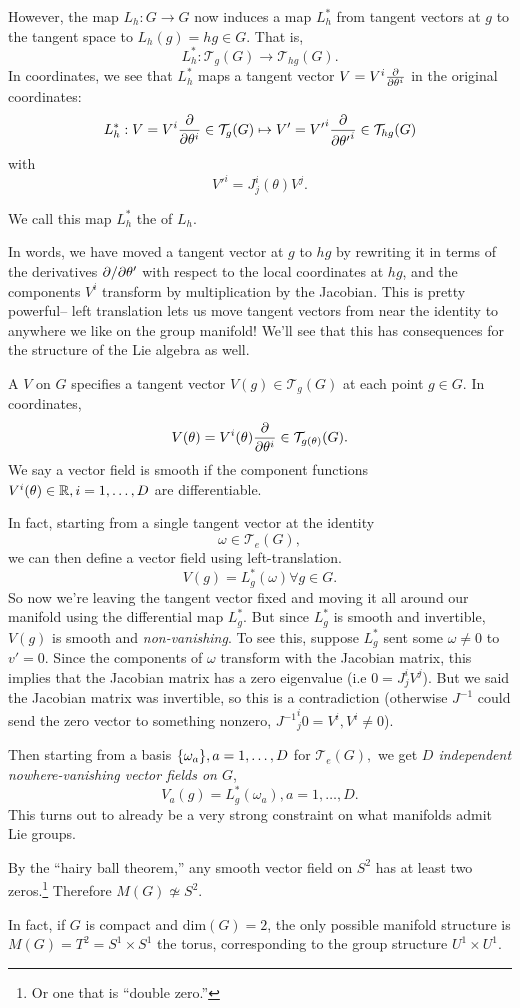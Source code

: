\begin{defn}
However, the map $L_h:G\to G$ now induces a map $L_h^*$ from tangent vectors at $g$ to the tangent space to $L_h(g)=hg\in G$. That is,
$$L_h^*: \mathcal{T}_g(G)\to \mathcal{T}_{hg}(G).$$
In coordinates, we see that $L_h^*$ maps a tangent vector $V=V^i \P{}{\theta^i}$ in the original coordinates:
$$L_h^*: V=V^i \P{}{\theta^i}\in \mathcal{T}_g(G)\mapsto V'={V'}^i \P{}{{\theta'}^i}\in \mathcal{T}_{hg}(G)$$
with $${V'}^i=J^i_j (\theta) V^j.$$

We call this map $L_h^*$ the  of $L_h$.
\end{defn}
In words, we have moved a tangent vector at $g$ to $hg$ by rewriting it in terms of the derivatives $\p/\p\theta'$ with respect to the local coordinates at $hg$, and the components $V^i$ transform by multiplication by the Jacobian. This is pretty powerful-- left translation lets us move tangent vectors from near the identity to anywhere we like on the group manifold! We'll see that this has consequences for the structure of the Lie algebra as well.

\begin{defn}
A  $V$ on $G$ specifies a tangent vector
$V(g)\in \mathcal{T}_g(G)$
at each point $g\in G$. In coordinates,
$$V(\theta)=V^i(\theta)\P{}{\theta^i} \in \mathcal{T}_{g(\theta)}(G).$$
We say a vector field is smooth if the component functions $V^i(\theta)\in \RR, i=1,\ldots,D$ are differentiable.
\end{defn}

In fact, starting from a single tangent vector at the identity
$$\omega\in \mathcal{T}_e(G),$$
we can then define a vector field using left-translation.
$$V(g)=L_g^*(\omega) \forall g\in G.$$
So now we're leaving the tangent vector fixed and moving it all around our manifold using the differential map $L_g^*$. But since $L_g^*$ is smooth and invertible, $V(g)$ is smooth and \emph{non-vanishing}.
To see this, suppose $L_g^*$ sent some $\omega \neq 0$ to $v'=0$. Since the components of $\omega$ transform with the Jacobian matrix, this implies that the Jacobian matrix has a zero eigenvalue (i.e $0=J^i_j V^j$). But we said the Jacobian matrix was invertible, so this is a contradiction (otherwise $J^{-1}$ could send the zero vector to something nonzero, ${J^{-1}}^i_j 0 = V^i, V^i\neq 0$).

Then starting from a basis $\set{\omega_a}, a=1,\ldots,D$ for $\mathcal{T}_e(G),$ we get \emph{$D$ independent nowhere-vanishing vector fields on $G$},
$$V_a(g)=L_g^*(\omega_a),a=1,\ldots,D.$$
This turns out to already be a very strong constraint on what manifolds admit Lie groups.
\begin{exm}
By the ``hairy ball theorem,'' any smooth vector field on $S^2$ has at least two zeros.\footnote{Or one that is ``double zero.''} Therefore $M(G)\not\simeq S^2$.

In fact, if $G$ is compact and $\text{dim}(G)=2$, the only possible manifold structure is $M(G)=T^2=S^1\times S^1$ the torus, corresponding to the group structure $U^1\times U^1.$
\end{exm}

